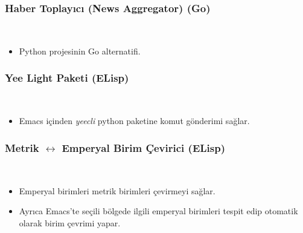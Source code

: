 \documentclass[a4paper, 9pt]{extarticle}
\begin{document}
\subsubsection{Haber Toplayıcı (News Aggregator) (Go)} \hfill \\
\vspace{-1.9em} \begin{itemize}
    \itemsep-0.7em
    \item Python projesinin Go alternatifi.
\end{itemize}

\subsubsection{Yee Light Paketi (ELisp)} \hfill \\
\vspace{-1.9em}\begin{itemize}
    \itemsep-0.7em
    \item Emacs içinden \emph{yeecli} python paketine komut gönderimi sağlar.
\end{itemize}

\subsubsection{Metrik $\longleftrightarrow$ Emperyal Birim Çevirici (ELisp)} \hfill \\
\vspace{-1.9em}\begin{itemize}
    \itemsep-0.7em
    \item Emperyal birimleri metrik birimleri çevirmeyi sağlar.
    \item Ayrıca Emacs'te seçili bölgede ilgili emperyal birimleri tespit edip otomatik olarak birim çevrimi yapar.
\end{itemize}

\mydiller{}
\myteknikbecerilerb{}
\myhobilerb{}

\end{document}
